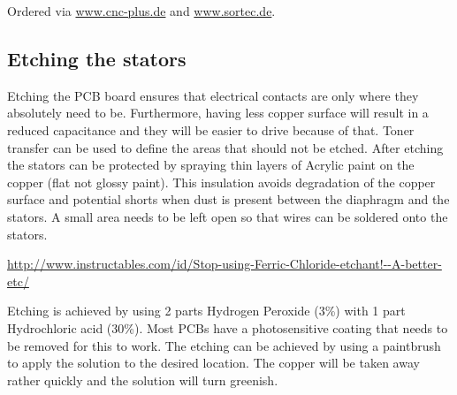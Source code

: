 \documentclass{article}
\begin{document}
Ordered via \url{www.cnc-plus.de} and \url{www.sortec.de}.

\subsection{Etching the stators}
\label{s:driver:etching}
Etching the PCB board ensures that electrical contacts are only where they absolutely need to be. Furthermore, having less copper surface will result in a reduced capacitance and they will be easier to drive because of that. Toner transfer can be used to define the areas that should not be etched. After etching the stators can be protected by spraying thin layers of Acrylic paint on the copper (flat not glossy paint). This insulation avoids degradation of the copper surface and potential shorts when dust is present between the diaphragm and the stators. A small area needs to be left open so that wires can be soldered onto the stators.

\url{http://www.instructables.com/id/Stop-using-Ferric-Chloride-etchant!--A-better-etc/}

Etching is achieved by using 2 parts Hydrogen Peroxide (3\%) with 1 part Hydrochloric acid (30\%). Most PCBs have a photosensitive coating that needs to be removed for this to work. The etching can be achieved by using a paintbrush to apply the solution to the desired location. The copper will be taken away rather quickly and the solution will turn greenish.
\end{document}
